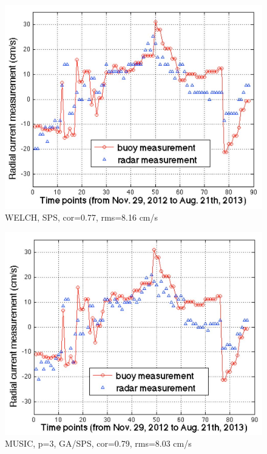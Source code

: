 \documentclass[12pt]{beamer}
\begin{document}
\begin{frame}
  \begin{figure}[htbp]
      \includegraphics[width=0.5\linewidth]{figs/f.jpg}
       \caption{WELCH, SPS, cor=0.77, rms=8.16 cm/s}
  \end{figure}
\end{frame}

\begin{frame}
  \begin{figure}[htbp]
      \includegraphics[width=0.5\linewidth]{figs/g.jpg}
       \caption{MUSIC, p=3, GA/SPS, cor=0.79,
       rms=8.03 cm/s}
  \end{figure}
\end{frame}
\end{document}

